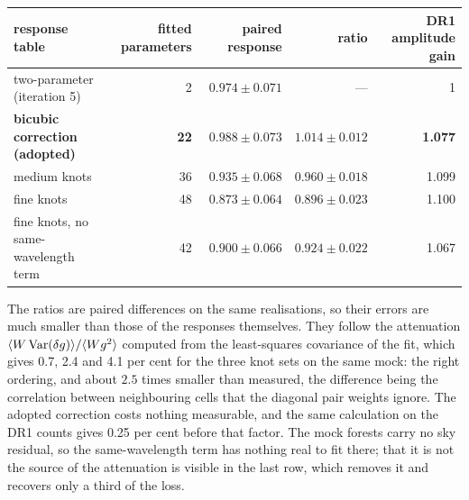 \documentclass[11pt,a4paper]{article}
\begin{document}
\begin{center}\small
\begin{tabular}{lrrrr}
\toprule
response table & fitted parameters & paired response & ratio & DR1 amplitude gain\\
\midrule
two-parameter (iteration 5) & 2 & $0.974\pm0.071$ & --- & 1\\
\textbf{bicubic correction (adopted)} & \textbf{22} & $\mathbf{0.988\pm0.073}$ & $\mathbf{1.014\pm0.012}$ & \textbf{1.077}\\
medium knots & 36 & $0.935\pm0.068$ & $0.960\pm0.018$ & 1.099\\
fine knots & 48 & $0.873\pm0.064$ & $0.896\pm0.023$ & 1.100\\
fine knots, no same-wavelength term & 42 & $0.900\pm0.066$ & $0.924\pm0.022$ & 1.067\\
\bottomrule
\end{tabular}
\end{center}

\noindent The ratios are paired differences on the same realisations, so their errors are much smaller than those of the responses themselves. They follow the attenuation $\langle W\,{\rm Var}(\delta g)\rangle/\langle Wg^2\rangle$ computed from the least-squares covariance of the fit, which gives 0.7, 2.4 and 4.1 per cent for the three knot sets on the same mock: the right ordering, and about $2.5$ times smaller than measured, the difference being the correlation between neighbouring cells that the diagonal pair weights ignore. The adopted correction costs nothing measurable, and the same calculation on the DR1 counts gives 0.25 per cent before that factor. The mock forests carry no sky residual, so the same-wavelength term has nothing real to fit there; that it is not the source of the attenuation is visible in the last row, which removes it and recovers only a third of the loss.
\end{document}
